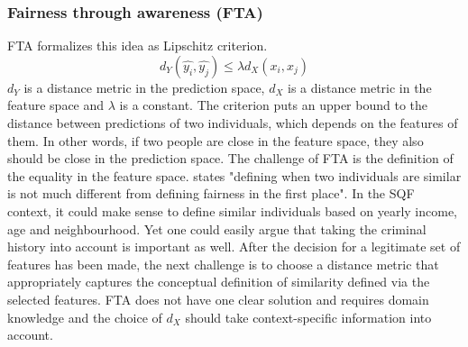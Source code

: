 \subsubsection*{Fairness through awareness (FTA)}
FTA formalizes this idea as Lipschitz criterion. $$d_Y(\hat{y_i}, \hat{y_j}) \leq \lambda {d_X}(x_i, x_j)$$
$d_Y$ is a distance metric in the prediction space, $d_X$ is a distance metric in the feature space and $\lambda$ is a constant.
The criterion puts an upper bound to the distance between predictions of two individuals, which depends on the features of them. In other words, if two people are close in the feature space, they also should be close in the prediction space. The challenge of FTA is the definition of the equality in the feature space. \cite{castelnovo2022} states "defining when two individuals are similar is not much different from defining fairness in the first place".
In the SQF context, it could make sense to define similar individuals based on yearly income, age and neighbourhood.
Yet one could easily argue that taking the criminal history into account is important as well. After the decision for a legitimate set of features has been made, the next challenge is to choose a distance metric that appropriately captures the conceptual definition of similarity defined via the selected features.
FTA does not have one clear solution and requires domain knowledge and the choice of $d_X$ should take context-specific information into account.

